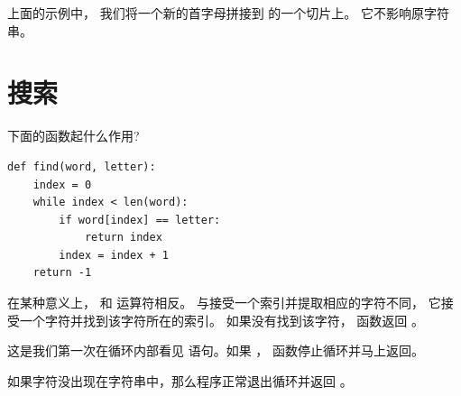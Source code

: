 %

上面的示例中， 我们将一个新的首字母拼接到  的一个切片上。 它不影响原字符串。


\section{搜索}
\label{find}

  

下面的函数起什么作用?

\begin{lstlisting}
def find(word, letter):
    index = 0
    while index < len(word):
        if word[index] == letter:
            return index
        index = index + 1
    return -1
\end{lstlisting}

%

在某种意义上， 和 \li{[]} 运算符相反。 与接受一个索引并提取相应的字符不同， 它接受一个字符并找到该字符所在的索引。 如果没有找到该字符， 函数返回 。


这是我们第一次在循环内部看见  语句。如果 ，
函数停止循环并马上返回。


如果字符没出现在字符串中，那么程序正常退出循环并返回 。

    

